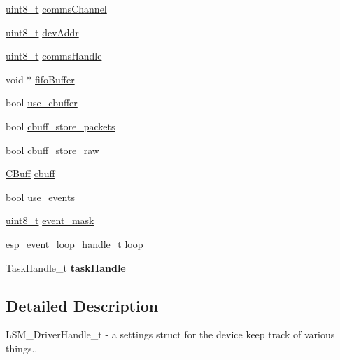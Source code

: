 \begin{DoxyCompactItemize}
\item 
\hyperlink{vl53l0x__types_8h_aba7bc1797add20fe3efdf37ced1182c5}{uint8\+\_\+t} \hyperlink{structLSM__DriverSettings_add57a764f16d59e082ddb79bc7c74180}{comms\+Channel}
\item 
\hyperlink{vl53l0x__types_8h_aba7bc1797add20fe3efdf37ced1182c5}{uint8\+\_\+t} \hyperlink{structLSM__DriverSettings_a8e1a6b136f50016aaab1ae491a751336}{dev\+Addr}
\item 
\hyperlink{vl53l0x__types_8h_aba7bc1797add20fe3efdf37ced1182c5}{uint8\+\_\+t} \hyperlink{structLSM__DriverSettings_a2d20232c5ac5d8eb5190ea9e67a80520}{comms\+Handle}
\item 
void $\ast$ \hyperlink{structLSM__DriverSettings_afadd6b60a58629b31e48a5f8b4903d8e}{fifo\+Buffer}
\item 
bool \hyperlink{structLSM__DriverSettings_a9ac1f71e45d64c08137e4a66ceb037b6}{use\+\_\+cbuffer}
\item 
bool \hyperlink{structLSM__DriverSettings_a16df6adafa33bd8989b4c8dc4bb35cfc}{cbuff\+\_\+store\+\_\+packets}
\item 
bool \hyperlink{structLSM__DriverSettings_ac9afe83a3868f908a254f4b899fbf545}{cbuff\+\_\+store\+\_\+raw}
\item 
\hyperlink{structCBuffer__Handle}{C\+Buff} \hyperlink{structLSM__DriverSettings_a40dcf1c51a0b4d0725ac4ddde56afcf3}{cbuff}
\item 
bool \hyperlink{structLSM__DriverSettings_ab816e595f9f91a9a5887e806d62458b0}{use\+\_\+events}
\item 
\hyperlink{vl53l0x__types_8h_aba7bc1797add20fe3efdf37ced1182c5}{uint8\+\_\+t} \hyperlink{structLSM__DriverSettings_a97c8a07da0167f7022bcff555ec28b9c}{event\+\_\+mask}
\item 
esp\+\_\+event\+\_\+loop\+\_\+handle\+\_\+t \hyperlink{structLSM__DriverSettings_a88424f1e21f40ed7c4eac94eb449c051}{loop}
\item 
\mbox{\label{structLSM__DriverSettings_a30d4b8a2c3eb2682503e8f38eb08257d}} 
Task\+Handle\+\_\+t {\bfseries task\+Handle}
\end{DoxyCompactItemize}


\subsection{Detailed Description}
L\+S\+M\+\_\+\+Driver\+Handle\+\_\+t -\/ a settings struct for the device keep track of various things.. 

